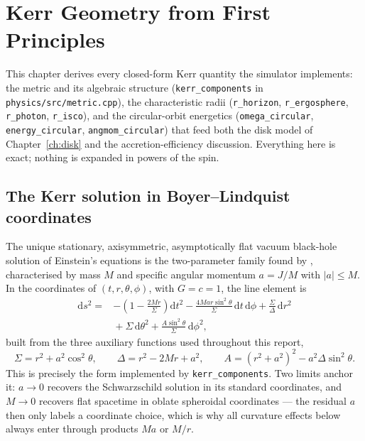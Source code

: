 \chapter{Kerr Geometry from First Principles}
\label{ch:kerr}

This chapter derives every closed-form Kerr quantity the simulator
implements: the metric and its algebraic structure
(\texttt{kerr\_components} in \texttt{physics/src/metric.cpp}), the
characteristic radii (\texttt{r\_horizon}, \texttt{r\_ergosphere},
\texttt{r\_photon}, \texttt{r\_isco}), and the circular-orbit energetics
(\texttt{omega\_circular}, \texttt{energy\_circular},
\texttt{angmom\_circular}) that feed both the disk model of
Chapter~\ref{ch:disk} and the accretion-efficiency discussion. Everything
here is exact; nothing is expanded in powers of the spin.

\section{The Kerr solution in Boyer--Lindquist coordinates}
\label{sec:kerrmetric}

The unique stationary, axisymmetric, asymptotically flat vacuum black-hole
solution of Einstein's equations is the two-parameter family found by
\citet{Kerr1963}, characterised by mass $M$ and specific angular momentum
$a = J/M$ with $|a| \leq M$. In the coordinates of
\citet{BoyerLindquist1967} $(t, r, \theta, \phi)$, with $G = c = 1$, the
line element is
\begin{align}
\mathrm{d}s^2 ={}& -\left(1-\frac{2Mr}{\Sigma}\right)\mathrm{d}t^2
 - \frac{4Mar\sin^2\theta}{\Sigma}\,\mathrm{d}t\,\mathrm{d}\phi
 + \frac{\Sigma}{\Delta}\,\mathrm{d}r^2 \nonumber\\
&{}+ \Sigma\,\mathrm{d}\theta^2
 + \frac{A\sin^2\theta}{\Sigma}\,\mathrm{d}\phi^2,
\label{eq:kerr}
\end{align}
built from the three auxiliary functions used throughout this report,
\begin{equation}
\Sigma = r^2+a^2\cos^2\theta, \qquad
\Delta = r^2-2Mr+a^2, \qquad
A = (r^2+a^2)^2 - a^2\Delta\sin^2\theta.
\label{eq:auxfns}
\end{equation}
This is precisely the form implemented by \texttt{kerr\_components}. Two
limits anchor it: $a \to 0$ recovers the Schwarzschild solution in its
standard coordinates, and $M \to 0$ recovers flat spacetime in oblate
spheroidal coordinates — the residual $a$ then only labels a coordinate
choice, which is why all curvature effects below always enter through
products $Ma$ or $M/r$.

